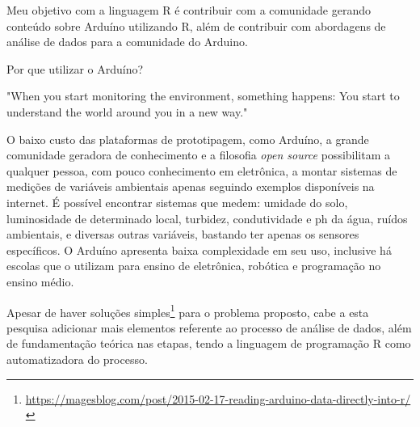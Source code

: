% 
Meu objetivo com a linguagem R é contribuir com a 
comunidade gerando conteúdo sobre Arduíno utilizando R, além de contribuir com 
abordagens de análise de dados para a comunidade do Arduino.


Por que utilizar o Arduíno? 
\begin{citacao}[english]
  "When you start monitoring the environment,
  something happens: You start to understand the world around you in a new way." \cite{Gertz2012}
\end{citacao}

O baixo custo das plataformas de prototipagem, como Arduíno, a 
grande comunidade geradora de conhecimento e a filosofia \emph{open source}
possibilitam a qualquer pessoa, com pouco conhecimento em eletrônica, a
montar sistemas de medições de variáveis ambientais apenas seguindo exemplos 
disponíveis na internet. É possível encontrar sistemas que medem: umidade do 
solo, luminosidade de determinado local, turbidez, condutividade e ph da água, ruídos 
ambientais, e diversas outras variáveis, bastando ter apenas os sensores 
específicos. O Arduíno apresenta baixa complexidade em seu uso, inclusive há escolas que o utilizam 
para ensino de eletrônica, robótica e programação no ensino médio.
 
Apesar de haver soluções simples\footnote{\url{https://magesblog.com/post/2015-02-17-reading-arduino-data-directly-into-r/}}
para o problema proposto, cabe a esta pesquisa adicionar mais elementos 
referente ao processo de análise de dados, além de fundamentação teórica nas 
etapas, tendo a linguagem de programação R como automatizadora do processo.
